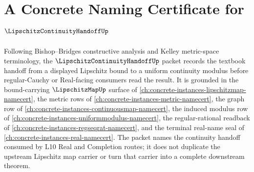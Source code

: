 \chapter{A Concrete Naming Certificate for $\LipschitzContinuityHandoffUp$}
\label{ch:concrete-instances-lipschitz-continuity-handoff-namecert}

Following Bishop--Bridges constructive analysis and Kelley metric-space terminology, the $\LipschitzContinuityHandoffUp$ packet records the textbook handoff from a displayed Lipschitz bound to a uniform continuity modulus before regular-Cauchy or Real-facing consumers read the result. It is grounded in the bound-carrying $\LipschitzMapUp$ surface of \autoref{ch:concrete-instances-lipschitzmap-namecert}, the metric rows of \autoref{ch:concrete-instances-metric-namecert}, the graph row of \autoref{ch:concrete-instances-continuousmap-namecert}, the induced modulus row of \autoref{ch:concrete-instances-uniformmodulus-namecert}, the regular-rational readback of \autoref{ch:concrete-instances-regseqrat-namecert}, and the terminal real-name seal of \autoref{ch:concrete-instances-real-namecert}. The packet names the continuity handoff consumed by L10 Real and Completion routes; it does not duplicate the upstream Lipschitz map carrier or turn that carrier into a complete downstream theorem.

